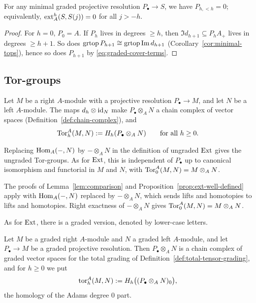 \begin{lemma}\label{lem:resolution-degrees}
For any minimal graded projective resolution $P_\bullet \to S$, we have  $P_{h,<h}=0$; equivalently, $\operatorname{ext}\nolimits_A^h(S,S(j))=0$ for all $j>-h$.
\end{lemma}

\begin{proof}
For $h=0$, $P_0=A$.
If $P_h$ lives in degrees $\geq h$, then $\Im d_{h+1}\subseteq P_hA_+$ lives in degrees $\geq h+1$.
So does $\operatorname{grtop}\nolimits P_{h+1}\cong\operatorname{grtop}\nolimits\operatorname{Im}\nolimits d_{h+1}$ (Corollary~\ref{cor:minimal-tops}), hence so does $P_{h+1}$ by \eqref{eq:graded-cover-terms}.
\end{proof}


\begin{advanced}[suppressfirstparskip=true,innertopmargin=0pt]
\subsection{Tor-groups}

\begin{definition}\label{def:tor}
Let $M$ be a right $A$-module with a projective resolution $P_\bullet\to M$, and let $N$ be a left $A$-module.
The maps $d_h\otimes\operatorname{id}_N$ make $P_\bullet\otimes_AN$ a chain complex of vector spaces (Definition~\ref{def:chain-complex}), and
\[
\operatorname{Tor}\nolimits_h^A(M,N):=H_h(P_\bullet\otimes_AN)\qquad\text{for all }h\geq0.
\]
\end{definition}

Replacing $\operatorname{Hom}\nolimits_A(-,N)$ by $-\otimes_AN$ in the definition of ungraded $\operatorname{Ext}\nolimits$ gives the ungraded Tor-groups.
As for $\operatorname{Ext}\nolimits$, this is independent of $P_\bullet$ up to canonical isomorphism and functorial in $M$ and $N$, with $\operatorname{Tor}\nolimits_0^A(M,N)=M\otimes_AN$.

The proofs of Lemma~\ref{lem:comparison} and Proposition~\ref{prop:ext-well-defined} apply with $\operatorname{Hom}\nolimits_A(-,N)$ replaced by $-\otimes_AN$, which sends lifts and homotopies to lifts and homotopies.
Right exactness of $-\otimes_AN$ gives $\operatorname{Tor}\nolimits_0^A(M,N)=M\otimes_AN$.

As for $\operatorname{Ext}\nolimits$, there is a graded version, denoted by lower-case letters.

\begin{definition}\label{def:graded-tor}
Let $M$ be a graded right $A$-module and $N$ a graded left $A$-module, and let $P_\bullet\to M$ be a graded projective resolution.
Then $P_\bullet\otimes_AN$ is a chain complex of graded vector spaces for the total grading of Definition~\ref{def:total-tensor-grading}, and for $h\geq0$ we put
\[
\operatorname{tor}\nolimits_h^A(M,N):=H_h\bigl((P_\bullet\otimes_AN)_0\bigr),
\]
the homology of the Adams degree $0$ part.
\end{definition}


\end{advanced}
